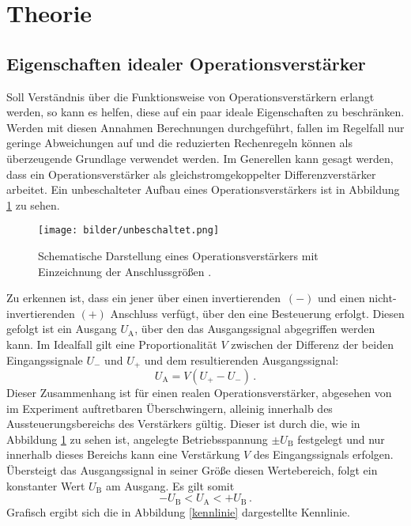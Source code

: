 \section{Theorie}\label{theorie}
\subsection{Eigenschaften idealer Operationsverstärker}
Soll Verständnis über die Funktionsweise von Operationsverstärkern erlangt werden, so kann es helfen, diese auf ein paar ideale Eigenschaften zu beschränken. Werden mit diesen Annahmen Berechnungen durchgeführt, fallen im Regelfall nur geringe Abweichungen auf und die reduzierten Rechenregeln können als überzeugende Grundlage verwendet werden.
Im Generellen kann gesagt werden, dass ein Operationsverstärker als gleichstromgekoppelter Differenzverstärker arbeitet.
Ein unbeschalteter Aufbau eines Operationsverstärkers ist in Abbildung \ref{unbeschaltet} zu sehen.

\begin{figure}[H]
  \centering
  \texttt{[image: bilder/unbeschaltet.png]}
  \caption{Schematische Darstellung eines Operationsverstärkers mit Einzeichnung der Anschlussgrößen \cite{anleitung}.}
  \label{unbeschaltet}
\end{figure}

Zu erkennen ist, dass ein jener über einen invertierenden~$(-)$  und einen nicht-invertierenden $(+)$  Anschluss verfügt, über den eine Besteuerung erfolgt. Diesen gefolgt ist ein Ausgang $U_\text{A}$, über den das Ausgangssignal abgegriffen werden kann.
Im Idealfall gilt eine Proportionalität $V$ zwischen der Differenz der beiden Eingangssignale $U_-$ und $U_+$ und dem resultierenden Ausgangssignal:
\begin{equation}
  U_\text{A}=V(U_+-U_-)\,.
\end{equation}
Dieser Zusammenhang ist für einen realen Operationsverstärker, abgesehen von im Experiment auftretbaren Überschwingern, alleinig innerhalb des Aussteuerungsbereichs des Verstärkers gültig. Dieser ist durch die, wie in Abbildung \ref{unbeschaltet} zu sehen ist, angelegte Betriebsspannung $\pm U_\text{B}$ festgelegt und nur innerhalb dieses Bereichs kann eine Verstärkung $V$ des Eingangssignals erfolgen. Übersteigt das Ausgangssignal in seiner Größe diesen Wertebereich, folgt ein konstanter Wert $U_\text{B}$ am Ausgang.
Es gilt somit
\begin{equation}
  -U_\text{B} < U_\text{A} < +U_\text{B}\,.
\end{equation}
Grafisch ergibt sich die in Abbildung \ref{kennlinie} dargestellte Kennlinie.

